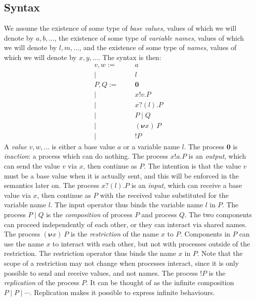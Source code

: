\documentclass[a4paper]{article}
\newcommand{\Pend}{\bm{0}}
\newcommand{\Ppar}[2]{#1 \mid #2}
\newcommand{\Pres}[2]{(\bm{\nu} #1)~#2}
\newcommand{\Pout}[3]{#1 ! #2 . #3}
\newcommand{\Pin}[3]{#1 ? (#2) . #3}
\newcommand{\Preplicate}[1]{{!}#1}
\begin{document}
\subsection{Syntax}
We assume the existence of some type of \emph{base values}, values of which we will denote by \( a, b, \dots \), the existence of some type of \emph{variable names}, values of which we will denote by \( l, m, \dots \), and the existence of some type of \emph{names}, values of which we will denote by \( x, y, \dots \).
The syntax is then:
\begin{align*}
  v,w :=&&& a \\
  |&&& l \\
  P,Q :=&&& \Pend \\
  |&&& \Pout{x}{v}{P} \\
  |&&& \Pin{x}{l}{P} \\
  |&&& \Ppar{P}{Q} \\
  |&&& \Pres{x}{P} \\
  |&&& \Preplicate{P}
\end{align*}
A \emph{value} \( v, w, \dots \) is either a base value \( a \) or a variable name \( l \).
The process \( \Pend \) is \emph{inaction}: a process which can do nothing.
The process \( \Pout{x}{a}{P} \) is an \emph{output}, which can send the value \( v \) via \( x \), then continue as \( P \).
The intention is that the value \( v \) must be a base value when it is actually sent, and this will be enforced in the semantics later on.
The process \( \Pin{x}{l}{P} \) is an \emph{input}, which can receive a base value via \( x \), then continue as \( P \) with the received value substituted for the variable name \( l \).
The input operator thus binds the variable name \( l \) in \( P \).
The process \( \Ppar{P}{Q} \) is the \emph{composition} of process \( P \) and process \( Q \).
The two components can proceed independently of each other, or they can interact via shared names.
The process \( \Pres{x}{P} \) is the \emph{restriction} of the name \( x \) to \( P \).
Components in \( P \) can use the name \( x \) to interact with each other, but not with processes outside of the restriction.
The restriction operator thus binds the name \( x \) in \( P \).
Note that the scope of a restriction may not change when processes interact, since it is only possible to send and receive values, and not names.
The process \( \Preplicate{P} \) is the \emph{replication} of the process \( P \).
It can be thought of as the infinite composition \( \Ppar{P}{\Ppar{P}{\cdots}} \).
Replication makes it possible to express infinite behaviours.
\end{document}

